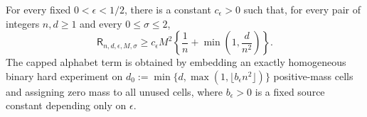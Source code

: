 For every fixed \(0<\epsilon<1/2\), there is a constant \(c_{\epsilon}>0\) such that, for every pair of integers \(n,d\ge1\) and every \(0\le\sigma\le2\),
\[
 \mathsf R_{n,d,\epsilon,M,\sigma}
 \ge c_{\epsilon}M^2\left\{\frac1n+\min\left(1,\frac d{n^2}\right)\right\}.
\]
The capped alphabet term is obtained by embedding an exactly homogeneous binary hard experiment on \(d_0:=\min\{d,\max(1,\lfloor b_{\epsilon}n^2\rfloor)\}\) positive-mass cells and assigning zero mass to all unused cells, where \(b_{\epsilon}>0\) is a fixed source constant depending only on \(\epsilon\).